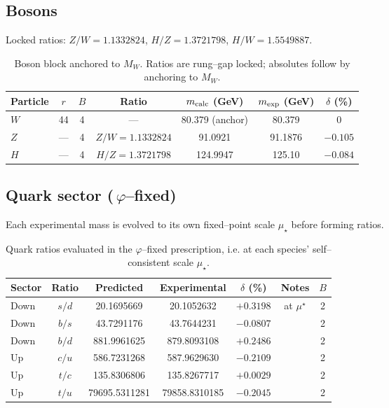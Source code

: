 \documentclass[%
 amsmath,amssymb,
 aps,
prb,
floatfix, showkeys
]{revtex4-2}
\begin{document}
\subsection{Bosons}
Locked ratios: $Z/W=1.1332824$, $H/Z=1.3721798$, $H/W=1.5549887$.
\begin{table}[H]
\caption{Boson block anchored to $M_W$. Ratios are rung--gap locked; absolutes follow by anchoring to $M_W$.}
\label{tab:bosons}
\begin{tabular}{l c c c c c c}
\hline
Particle & $r$ & $B$ & Ratio & $m_{\rm calc}$ (GeV) & $m_{\rm exp}$ (GeV) & $\delta$ (\%) \\
\hline
$W$ & 44  & 4 & ---                 & 80.379 (anchor) & 80.379   & 0 \\
$Z$ & --- & 4 & $Z/W=1.1332824$    & 91.0921         & 91.1876  & $-0.105$ \\
$H$ & --- & 4 & $H/Z=1.3721798$    & 124.9947        & 125.10   & $-0.084$ \\
\hline
\end{tabular}
\end{table}

\subsection{Quark sector (\,$\varphi$--fixed)}
Each experimental mass is evolved to its own fixed--point scale $\mu_\star$ before forming ratios.
\begin{table}[H]
\caption{Quark ratios evaluated in the $\varphi$--fixed prescription, i.e. at each species' self--consistent scale $\mu_\star$.}
\label{tab:quarks}
\begin{tabular}{l c c c c c c}
\hline
Sector & Ratio & Predicted & Experimental & $\delta$ (\%) & Notes & $B$ \\
\hline
Down & $s/d$ & 20.1695669   & 20.1052632   & $+0.3198$ & at $\mu^\star$ & 2 \\
Down & $b/s$ & 43.7291176   & 43.7644231   & $-0.0807$ &                & 2 \\
Down & $b/d$ & 881.9961625  & 879.8093108  & $+0.2486$ &                & 2 \\
Up   & $c/u$ & 586.7231268  & 587.9629630  & $-0.2109$ &                & 2 \\
Up   & $t/c$ & 135.8306806  & 135.8267717  & $+0.0029$ &                & 2 \\
Up   & $t/u$ & 79695.5311281 & 79858.8310185 & $-0.2045$ &               & 2 \\
\hline
\end{tabular}
\end{table}
\end{document}
